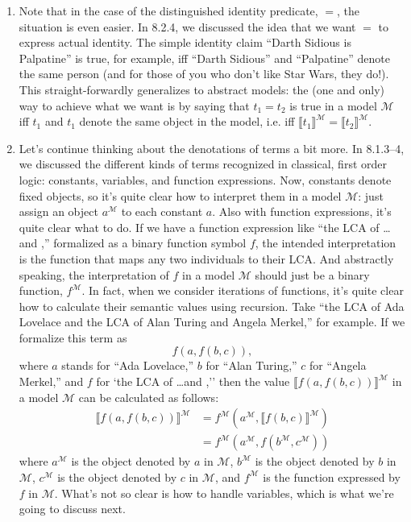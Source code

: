 \begin{enumerate}[\thesection.1]
	\item Note that in the case of the distinguished identity predicate, $=$, the situation is even easier. In 8.2.4, we discussed the idea that we want $=$ to express actual identity. The simple identity claim ``Darth Sidious is Palpatine'' is true, for example, iff ``Darth Sidious'' and ``Palpatine'' denote the same person (and for those of you who don't like Star Wars, they do!). This straight-forwardly generalizes to abstract models: the (one and only) way to achieve what we want is by saying that $t_1=t_2$ is true in a model $\mathcal{M}$ iff $t_1$ and $t_1$ denote the same object in the model, i.e. iff $\llbracket t_1\rrbracket^\mathcal{M}=\llbracket t_2\rrbracket^\mathcal{M}$.
	
	\item Let's continue thinking about the denotations of terms a bit more. In 8.1.3--4, we discussed the different kinds of terms recognized in classical, first order logic: constants, variables, and function expressions. Now, constants denote fixed objects, so it's quite clear how to interpret them in a model $\mathcal{M}$: just assign an object $a^\mathcal{M}$ to each constant $a$. Also with function expressions, it's quite clear what to do. If we have a function expression like ``the LCA of \dots and \underline{\phantom{\dots}},'' formalized as a binary function symbol $f$, the intended interpretation is the function that maps any two individuals to their LCA. And abstractly speaking, the interpretation of $f$ in a model $\mathcal{M}$ should just be a binary function, $f^\mathcal{M}$. In fact, when we consider iterations of functions, it's quite clear how to calculate their semantic values using recursion. Take ``the LCA of Ada Lovelace and the LCA of Alan Turing and Angela Merkel,'' for example. If we formalize this term as \[f(a,f(b,c)),\] where $a$ stands for ``Ada Lovelace,'' $b$ for ``Alan Turing,'' $c$ for ``Angela Merkel,'' and $f$ for `the LCA of \dots and \underline{\phantom{\dots}},'' then the value $\llbracket f(a,f(b,c))\rrbracket^\mathcal{M}$ in a model $\mathcal{M}$ can be calculated as follows: 
	\begin{align*}
	\llbracket f(a,f(b,c))\rrbracket^\mathcal{M}&=f^\mathcal{M}(a^\mathcal{M}, \llbracket f(b,c)\rrbracket^\mathcal{M})\\
	&=f^\mathcal{M}(a^\mathcal{M}, f(b^\mathcal{M}, c^\mathcal{M}))
	\end{align*} where $a^\mathcal{M}$ is the object denoted by $a$ in $\mathcal{M}$, $b^\mathcal{M}$ is the object denoted by $b$ in $\mathcal{M}$, $c^\mathcal{M}$ is the object denoted by $c$ in $\mathcal{M}$, and $f^\mathcal{M}$ is the function expressed by $f$ in $\mathcal{M}$. What's not so clear is how to handle variables, which is what we're going to discuss next.
	

\end{enumerate}
